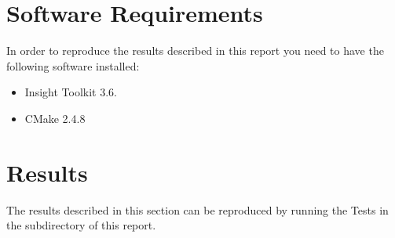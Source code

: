 \documentclass{InsightArticle}
\begin{document}
\section{Software Requirements}

In order to reproduce the results described in this report you need to have the
following software installed:

\begin{itemize}
  \item  Insight Toolkit 3.6.
  \item  CMake 2.4.8
\end{itemize}


\appendix

\section{Results}

The results described in this section can be reproduced by running the Tests in
the  subdirectory of this report.
\end{document}
